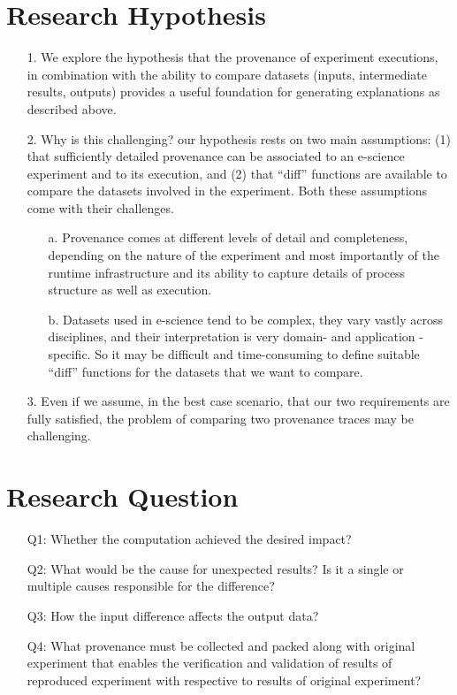 \documentclass[10pt,conference,twocolumn]{IEEEtran}
\begin{document}
\section{Research Hypothesis}
\begin{itemize}
 \item[1.]  We explore the hypothesis that the provenance of experiment executions, in combination with the ability to compare datasets (inputs, intermediate results, outputs) provides a useful foundation for generating explanations as described above.  
 \item[2.]  Why is this challenging?  our hypothesis rests on two main assumptions:  (1) that sufficiently detailed provenance can be associated to an e-science experiment and to its execution, and (2) that ``diff'' functions are available to compare the datasets involved in the experiment. Both these assumptions come with their challenges.
\begin{itemize}
 \item[a.] Provenance comes at different levels of detail and completeness, depending on the nature of the experiment and most importantly of the runtime infrastructure and its ability to capture details of process structure as well as execution. 
 \item[b.]  Datasets used in e-science tend to be complex, they vary vastly across disciplines,  and their interpretation is very domain- and application -specific. So it may be difficult and time-consuming to define suitable ``diff'' functions for the datasets that we want to compare.
\end{itemize}
 \item[3.] Even if we assume, in the best case scenario, that our two requirements are fully satisfied, the problem of comparing two provenance traces may be challenging.
\end{itemize}

\section{Research Question}
\begin{enumerate} \label{data}
 	 \item[Q1:] Whether the computation achieved the desired impact? 
	 \item[Q2:] What would be the cause for unexpected results? Is it a single or multiple causes responsible for the difference?
	 \item[Q3:] How the input difference affects the output data?
	 \item[Q4:] What provenance must be collected and packed along with original experiment that enables the verification and validation of results of reproduced experiment with respective to results of  original experiment? 
\end{enumerate}
\end{document}
